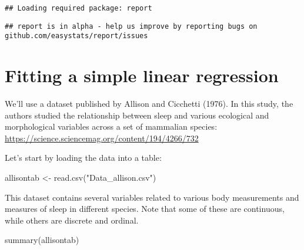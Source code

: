 \documentclass[
]{book}
\newenvironment{Shaded}{\begin{snugshade}}{\end{snugshade}}
\newcommand{\FunctionTok}[1]{\textcolor[rgb]{0.00,0.00,0.00}{#1}}
\newcommand{\NormalTok}[1]{#1}
\newcommand{\OtherTok}[1]{\textcolor[rgb]{0.56,0.35,0.01}{#1}}
\newcommand{\StringTok}[1]{\textcolor[rgb]{0.31,0.60,0.02}{#1}}
\begin{document}
\begin{verbatim}
## Loading required package: report
\end{verbatim}

\begin{verbatim}
## report is in alpha - help us improve by reporting bugs on github.com/easystats/report/issues
\end{verbatim}

\hypertarget{fitting-a-simple-linear-regression}{%
\section{Fitting a simple linear regression}\label{fitting-a-simple-linear-regression}}

We'll use a dataset published by Allison and Cicchetti (1976). In this study, the authors studied the relationship between sleep and various ecological and morphological variables across a set of mammalian species:
\url{https://science.sciencemag.org/content/194/4266/732}

Let's start by loading the data into a table:

\begin{Shaded}
\begin{Highlighting}[]
\NormalTok{allisontab }\OtherTok{\textless{}{-}} \FunctionTok{read.csv}\NormalTok{(}\StringTok{"Data\_allison.csv"}\NormalTok{)}
\end{Highlighting}
\end{Shaded}

This dataset contains several variables related to various body measurements and measures of sleep in different species. Note that some of these are continuous, while others are discrete and ordinal.

\begin{Shaded}
\begin{Highlighting}[]
\FunctionTok{summary}\NormalTok{(allisontab)}
\end{Highlighting}
\end{Shaded}
\end{document}
